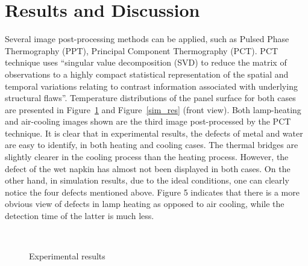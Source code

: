 \section{Results and Discussion}
Several image post-processing methods can be applied, such as Pulsed Phase Thermography (PPT)\citet{Maldague1996}, Principal Component Thermography (PCT)\citet{Rajic2002}. PCT technique uses “singular value decomposition (SVD) to reduce the matrix of observations to a highly compact statistical representation of the spatial and temporal variations relating to contrast information associated with underlying structural flaws”. Temperature distributions of the panel surface for both cases are presented in Figure~\ref{exp_res} and Figure~\ref{sim_res} (front view). Both lamp-heating and air-cooling images shown are the third image post-processed by the PCT technique. It is clear that in experimental results, the defects of metal and water are easy to identify, in both heating and cooling cases. The thermal bridges are slightly clearer in the cooling process than the heating process. However, the defect of the wet napkin has almost not been displayed in both cases. On the other hand, in simulation results, due to the ideal conditions, one can clearly notice the four defects mentioned above. Figure 5 indicates that there is a more obvious view of defects in lamp heating as opposed to air cooling, while the detection time of the latter is much less.
\begin{figure}
    \hspace{-20pt}
    \hspace{-10pt}
    \\

    \hspace{-20pt}
    \hspace{-10pt}
    \caption{Experimental results}
    \label{exp_res}
\end{figure}

